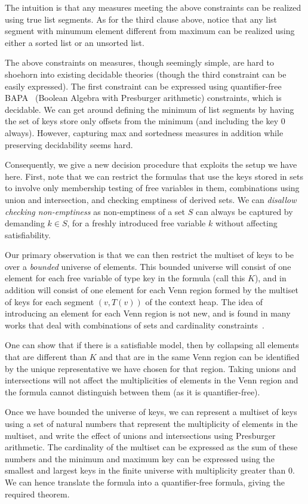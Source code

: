 The intuition is that any measures meeting the above constraints can be realized using true list
segments. As for the third clause above, notice that any list segment with minumum element different
from maximum can be realized using either a sorted list or an unsorted list.

The above constraints on measures, though seemingly simple, are hard to shoehorn into existing decidable theories
(though the third constraint can be easily expressed).
The first constraint can be expressed using quantifier-free BAPA~\cite{} (Boolean Algebra with Presburger
arithmetic) constraints, which is decidable. We can get around defining the minimum of list segments
by having the set of keys store only offsets from the minimum (and including the key $0$ always). However,
capturing max and sortedness measures in addition while preserving decidability seems hard.

Consequently, we give a new decision procedure that exploits the setup we have here.
First, note that we can restrict the formulas that use the keys stored in sets to involve
only membership testing of free variables in them, combinations using union and intersection,
and checking emptiness of derived sets. We can \emph{disallow checking non-emptiness} as non-emptiness
of a set $S$ can always be captured by demanding $k \in S$, for a freshly introduced free variable $k$
without affecting satisfiability.

Our primary observation is that we can then restrict the multiset of keys to be over a  \emph{bounded}
universe of elements. This bounded universe will consist of one element for each free variable of type key 
in the formula (call this $K$), and in addition will consist of one element for each Venn region formed by the multiset
of keys for each segment $(v,T(v))$ of the context heap. The idea of introducing an element for each Venn
region is not new, and is found in many works that deal with combinations of sets and cardinality constraints~\cite{}.

One can show that if there is a satisfiable model, then by collapsing all elements that are different
than $K$ and that are in the same Venn region can be identified by the unique representative we have chosen
for that region. Taking unions and intersections will not affect the multiplicities of elements in the Venn
region and the formula cannot distinguish between them (as it is quantifier-free).

Once we have bounded the universe of keys, we can represent a multiset of keys using a set of natural numbers
that represent the multiplicity of elements in the multiset, and write the effect of unions and intersections
using Presburger arithmetic. The cardinality of the multiset can be expressed as the sum of these numbers
and the minimum and maximum key can be expressed using the smallest and largest keys in the finite universe
with multiplicity greater than $0$. 
We can hence translate the formula into a quantifier-free formula, 
giving the required theorem.

